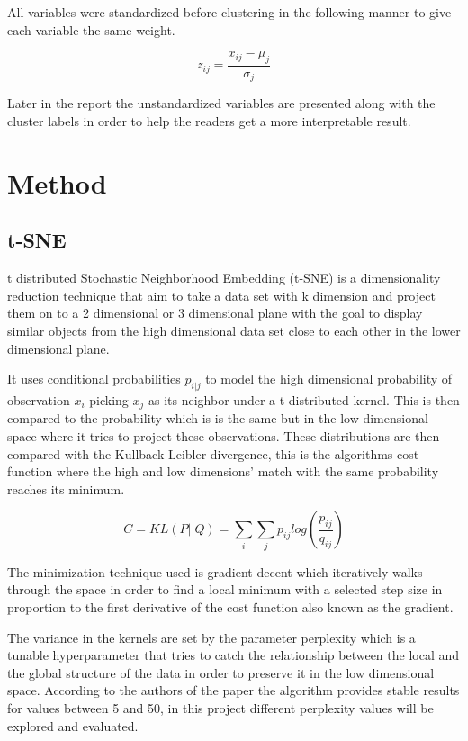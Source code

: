 \documentclass{article}
\begin{document}
All variables were standardized before clustering in the following manner to give each variable the same weight.

 $$z_{ij} = \frac{x_{ij} - \mu_{j}}{\sigma_{j}}$$ 

Later in the report the unstandardized variables are presented along with the cluster labels in order to help the readers get a more interpretable result.


\newpage


\section{Method}

\subsection{t-SNE}


t distributed Stochastic Neighborhood Embedding (t-SNE) is a dimensionality reduction technique that aim to take a data set with k dimension and project them on to a 2 dimensional or 3 dimensional plane with the goal to display similar objects from the high dimensional data set close to each other in the lower dimensional plane.

It uses conditional probabilities $p_{i|j}$  to model the high dimensional probability of observation $x_i$ picking $x_j$ as its neighbor under a t-distributed kernel. This is then compared to the probability  which is is the same but in the low dimensional space where it tries to project these observations. These distributions are then compared with the Kullback Leibler divergence, this is the algorithms cost function where the high and low dimensions’ match with the same probability reaches its minimum.

$$C = KL(P||Q)=\sum_i\sum_jp_{ij}log(\frac{p_{ij}}{q_{ij}})$$

The minimization technique used is gradient decent which iteratively walks through the space in order to find a local minimum with a selected step size in proportion to the first derivative of the cost function also known as the gradient.

The variance in the kernels are set by the parameter perplexity which is a tunable hyperparameter that tries to catch the relationship between the local and the global structure of the data in order to preserve it in the low dimensional space. According to the authors of the paper the algorithm provides stable results for values between 5 and 50, in this project different perplexity values will be explored and evaluated.\cite{ictdbid:2777}
\end{document}
